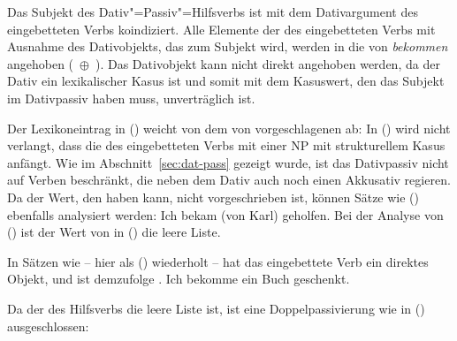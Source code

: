 \noindent
Das Subjekt des Dativ"=Passiv"=Hilfsverbs ist mit dem Dativargument des eingebetteten Verbs
koindiziert. Alle Elemente der \compsl des eingebetteten Verbs mit Ausnahme des Dativobjekts, das
zum Subjekt wird, werden in die \compsl von \emph{bekommen} angehoben (\, $\oplus$
\,). Das Dativobjekt kann nicht direkt angehoben werden, da der Dativ ein lexikalischer Kasus
ist und somit mit dem Kasuswert, den das Subjekt im Dativpassiv haben muss, unverträglich ist.

Der Lexikoneintrag in () weicht von dem von \citet[]{HM94a} vorgeschlagenen ab:
In () wird nicht verlangt, dass die \compsl des eingebetteten Verbs mit einer NP mit strukturellem Kasus
anfängt. Wie im Abschnitt~\ref{sec:dat-pass} gezeigt wurde, ist das Dativpassiv nicht auf Verben
beschränkt, die neben dem Dativ auch noch einen Akkusativ regieren. Da der Wert, den  
haben kann, nicht vorgeschrieben ist, können Sätze wie () ebenfalls analysiert werden:
\ea{}
Ich bekam (von Karl) geholfen.
\z
Bei der Analyse von () ist der Wert von  in () die leere Liste.

In Sätzen wie  -- hier als () wiederholt -- 
hat das eingebettete Verb ein direktes Objekt, und  ist demzufolge .
\ea\label{ex-ich-bekommen-ein-buch-geschenkt-zwei} 
Ich     bekomme ein Buch       geschenkt.
\z

%

\noindent
Da der \daw des Hilfsverbs die leere Liste ist, ist eine Doppelpassivierung wie
in () ausgeschlossen:
\z

